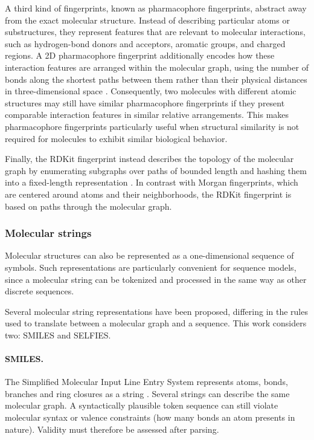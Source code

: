 \documentclass[a4paper,12pt]{article}
\begin{document}
A third kind of fingerprints, known as pharmacophore fingerprints, abstract away from the exact molecular structure. Instead of describing particular atoms or substructures, they represent features that are relevant to molecular interactions, such as hydrogen-bond donors and acceptors, aromatic groups, and charged regions. A 2D pharmacophore fingerprint additionally encodes how these interaction features are arranged within the molecular graph, using the number of bonds along the shortest paths between them rather than their physical distances in three-dimensional space \parencite{Gobbi_Poppinger_1998}. Consequently, two molecules with different atomic structures may still have similar pharmacophore fingerprints if they present comparable interaction features in similar relative arrangements. This makes pharmacophore fingerprints particularly useful when structural similarity is not required for molecules to exhibit similar biological behavior.

Finally, the RDKit fingerprint instead describes the topology of the molecular graph by enumerating subgraphs over paths of bounded length and hashing them into a fixed-length representation \parencite{Landrum_RDKit}. In contrast with Morgan fingerprints, which are centered around atoms and their neighborhoods, the RDKit fingerprint is based on paths through the molecular graph.

\subsubsection{Molecular strings}
Molecular structures can also be represented as a one-dimensional sequence of symbols. Such
representations are particularly convenient for sequence models, since a molecular
string can be tokenized and processed in the same way as other discrete
sequences.

Several molecular string representations have been proposed, differing in the rules
used to translate between a molecular graph and a sequence. This work considers two:
SMILES and SELFIES.

\paragraph{SMILES.}
The Simplified Molecular Input Line Entry System represents atoms, bonds, branches and ring closures as a string \parencite{Weininger_1988}. Several strings can describe the same molecular graph. A syntactically plausible token sequence can still violate molecular syntax or valence constraints (how many bonds an atom presents in nature). Validity must therefore be assessed after parsing.
\end{document}
